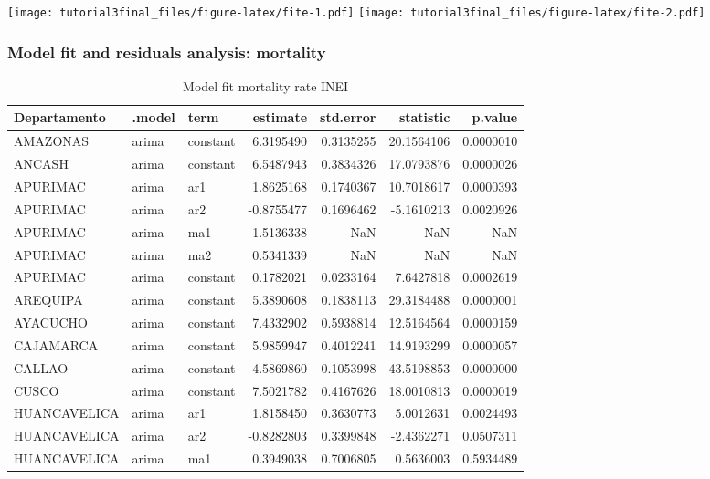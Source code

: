 \documentclass[
]{article}
\begin{document}
\texttt{[image: tutorial3final\_files/figure-latex/fite-1.pdf]} \texttt{[image: tutorial3final\_files/figure-latex/fite-2.pdf]}

\hypertarget{model-fit-and-residuals-analysis-mortality}{%
\subsubsection{Model fit and residuals analysis: mortality}\label{model-fit-and-residuals-analysis-mortality}}

\begin{table}[!h]

\caption{\label{tab:fitm}Model fit mortality rate INEI}
\centering
\begin{tabular}[t]{lllrrrr}
\toprule
Departamento & .model & term & estimate & std.error & statistic & p.value\\
\midrule
AMAZONAS & arima & constant & 6.3195490 & 0.3135255 & 20.1564106 & 0.0000010\\
ANCASH & arima & constant & 6.5487943 & 0.3834326 & 17.0793876 & 0.0000026\\
APURIMAC & arima & ar1 & 1.8625168 & 0.1740367 & 10.7018617 & 0.0000393\\
APURIMAC & arima & ar2 & -0.8755477 & 0.1696462 & -5.1610213 & 0.0020926\\
APURIMAC & arima & ma1 & 1.5136338 & NaN & NaN & NaN\\
\addlinespace
APURIMAC & arima & ma2 & 0.5341339 & NaN & NaN & NaN\\
APURIMAC & arima & constant & 0.1782021 & 0.0233164 & 7.6427818 & 0.0002619\\
AREQUIPA & arima & constant & 5.3890608 & 0.1838113 & 29.3184488 & 0.0000001\\
AYACUCHO & arima & constant & 7.4332902 & 0.5938814 & 12.5164564 & 0.0000159\\
CAJAMARCA & arima & constant & 5.9859947 & 0.4012241 & 14.9193299 & 0.0000057\\
\addlinespace
CALLAO & arima & constant & 4.5869860 & 0.1053998 & 43.5198853 & 0.0000000\\
CUSCO & arima & constant & 7.5021782 & 0.4167626 & 18.0010813 & 0.0000019\\
HUANCAVELICA & arima & ar1 & 1.8158450 & 0.3630773 & 5.0012631 & 0.0024493\\
HUANCAVELICA & arima & ar2 & -0.8282803 & 0.3399848 & -2.4362271 & 0.0507311\\
HUANCAVELICA & arima & ma1 & 0.3949038 & 0.7006805 & 0.5636003 & 0.5934489\\

\end{tabular}
\end{table}
\end{document}
